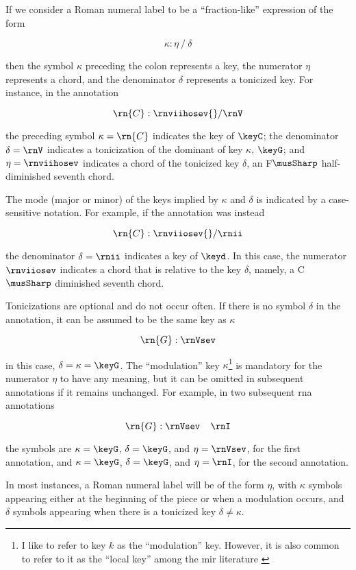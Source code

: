 
If we consider a Roman numeral label to be a
``fraction-like'' expression of the form

\begin{equation}
    \kappa : \eta \: / \: \delta
\end{equation}

then the symbol $\kappa$ preceding the colon represents a
key, the numerator $\eta$ represents a chord, and the
denominator $\delta$ represents a tonicized key. For
instance, in the annotation 

\begin{equation}
    \rn{C}:\rnviihosev{}/\rnV
\end{equation}

the preceding symbol $\kappa=\rn{C}$ indicates the key of
$\keyC$; the denominator $\delta = \rnV$ indicates a
tonicization of the dominant of key $\kappa$, $\keyG$; and
$\eta=\rnviihosev$ indicates a chord of the tonicized key
$\delta$, an F$\musSharp$ half-diminished seventh chord.

The mode (major or minor) of the keys implied by $\kappa$
and $\delta$ is indicated by a case-sensitive notation. For
example, if the annotation was instead

\begin{equation}
    \rn{C}:\rnviiosev{}/\rnii
\end{equation}

the denominator $\delta=\rnii$ indicates a key of $\keyd$.
In this case, the numerator $\rnviiosev$ indicates a chord
that is relative to the key $\delta$, namely, a C$\musSharp$
diminished seventh chord.

Tonicizations are optional and do not occur often. If there
is no symbol $\delta$ in the annotation, it can be assumed
to be the same key as $\kappa$

\begin{equation}
    \rn{G}:\rnVsev
\end{equation}

in this case, $\delta = \kappa = \keyG$. The ``modulation''
key $\kappa$\footnote{I like to refer to key $k$ as the
``modulation'' key. However, it is also common to refer to
it as the ``local key'' among the \gls{mir} literature
\parencite{napoleslopez2020local}} is mandatory for the
numerator $\eta$ to have any meaning, but it can be omitted
in subsequent annotations if it remains unchanged. For
example, in two subsequent \gls{rna} annotations

\begin{equation}
    \rn{G}:\rnVsev \;\;\;\; \rnI
\end{equation}

the symbols are $\kappa=\keyG$, $\delta=\keyG$, and
$\eta=\rnVsev$, for the first annotation, and
$\kappa=\keyG$, $\delta=\keyG$, and $\eta=\rnI$, for the
second annotation.

In most instances, a Roman numeral label will be of the form
$\eta$, with $\kappa$ symbols appearing either at the
beginning of the piece or when a modulation occurs, and
$\delta$ symbols appearing when there is a tonicized key
$\delta \neq \kappa$.
